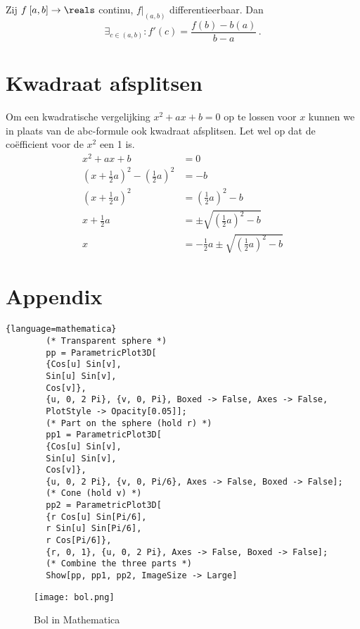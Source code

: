 \documentclass{article}
\begin{document}
    \begin{stelling}

        Zij $f\:[a,b] \to \reals$ continu, $f|_{(a,b)}$ differentieerbaar.
        Dan
        \[
            \exists_{c \in (a,b)} : f'(c) = \frac{f(b)-b(a)}{b-a}\,.
        \]
    \end{stelling}

    \section{Kwadraat afsplitsen}\label{sec:kwadraatAfsplitsen}
    Om een kwadratische vergelijking $x^2 + ax + b = 0$ op te lossen voor $x$ kunnen we in plaats van de abc-formule ook kwadraat afsplitsen.
    Let wel op dat de co\"efficient voor de $x^2$ een 1 is.
    \begin{align*}
        x^2 + a x + b &= 0 \\
        \left(x + \frac{1}{2} a\right)^2 - \left( \frac{1}{2}a \right)^2 &= - b \\
        \left(x + \frac{1}{2} a\right)^2 &= \left( \frac{1}{2}a \right)^2 - b \\
        x + \frac{1}{2} a &= \pm \sqrt{\left( \frac{1}{2}a \right)^2 - b} \\
        x &= -  \frac{1}{2} a \pm \sqrt{\left(\frac{1}{2}a \right)^2 - b}
    \end{align*}

    \newpage
    \section{Appendix}\label{sec:appendix}
    \begin{lstlisting}{language=mathematica}
        (* Transparent sphere *)
        pp = ParametricPlot3D[
        {Cos[u] Sin[v],
        Sin[u] Sin[v],
        Cos[v]},
        {u, 0, 2 Pi}, {v, 0, Pi}, Boxed -> False, Axes -> False,
        PlotStyle -> Opacity[0.05]];
        (* Part on the sphere (hold r) *)
        pp1 = ParametricPlot3D[
        {Cos[u] Sin[v],
        Sin[u] Sin[v],
        Cos[v]},
        {u, 0, 2 Pi}, {v, 0, Pi/6}, Axes -> False, Boxed -> False];
        (* Cone (hold v) *)
        pp2 = ParametricPlot3D[
        {r Cos[u] Sin[Pi/6],
        r Sin[u] Sin[Pi/6],
        r Cos[Pi/6]},
        {r, 0, 1}, {u, 0, 2 Pi}, Axes -> False, Boxed -> False];
        (* Combine the three parts *)
        Show[pp, pp1, pp2, ImageSize -> Large]
    \end{lstlisting}
    \begin{figure}[h!]
        \centering
        \texttt{[image: bol.png]}
        \caption{Bol in Mathematica}\label{bolMMa}
    \end{figure}
\end{document}
